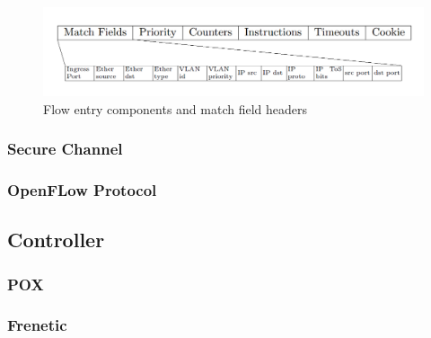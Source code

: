 \begin{figure}[h]
\centering
\includegraphics[width=1\textwidth]{./images/FlowEntryFormat.jpg}
\caption{Flow entry components and match field headers} \label{fig:FlowEntryComponents}
\end{figure}


\subsubsection{Secure Channel}
\label{subsec:SCSecureChannel}

\subsubsection{OpenFLow Protocol}
\label{subsec:OFProtocolSC}


\subsection{Controller}
\label{subsec:OFController}

\subsubsection{POX}
\label{subsec:ContPOX}

\subsubsection{Frenetic}
\label{subsec:ContFren}


